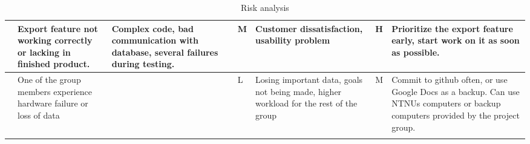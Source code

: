 \begin{landscape}
\begin{longtable}{| p{0.4cm} | p{4cm} | p{4cm} | p{2cm} | p{4cm} | p{1cm} | p{4cm} |}
	\stepcounter{riskId}
	\centering
		\arabic{riskId} &
        Export feature not working correctly or lacking in finished product. &
		Complex code, bad communication with database, several failures during testing. &
		\centering  M &
		Customer dissatisfaction, usability problem &
		\centering H &
		Prioritize the export feature early, start work on it as soon as possible. \\
	\hline

	\stepcounter{riskId}
	\centering
		\arabic{riskId} &
        One of the group members experience hardware failure or loss of data &
		& \centering L &
		Losing important data, goals not being made, higher workload for the rest of the group &
		\centering M &
		Commit to github often, or use Google Docs as a backup. Can use NTNUs computers or backup computers provided by the project group. \\
	\hline
\caption{Risk analysis}
\end{longtable}

\end{landscape}
